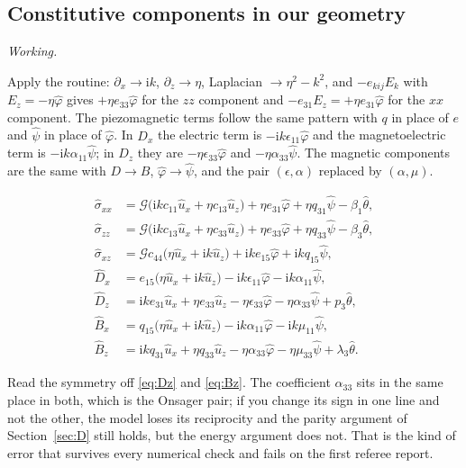 \documentclass[11pt,a4paper]{article}
\newif\ifshowworked \showworkedtrue
\newenvironment{worked}{\ifshowworked\par\smallskip\noindent\textit{Working.}\par\else\setbox0\vbox\bgroup\fi}{\ifshowworked\par\smallskip\else\egroup\fi}
\newcommand{\Gc}{\mathcal{G}}
\newcommand{\ii}{\mathrm{i}}
\newcommand{\bx}{\hat u_x}
\newcommand{\bz}{\hat u_z}
\newcommand{\bp}{\hat\varphi}
\newcommand{\bpsi}{\hat\psi}
\newcommand{\bt}{\hat\theta}
\newcommand{\aME}{\alpha}
\begin{document}
\subsection{Constitutive components in our geometry}

\begin{worked}
Apply the routine: $\partial_x\to\ii k$, $\partial_z\to\eta$, Laplacian $\to\eta^2-k^2$, and $-e_{kij}E_k$
with $E_z=-\eta\bp$ gives $+\eta e_{33}\bp$ for the $zz$ component and $-e_{31}E_z=+\eta e_{31}\bp$ for the
$xx$ component. The piezomagnetic terms follow the same pattern with $q$ in place of $e$ and $\bpsi$ in place
of $\bp$. In $D_x$ the electric term is $-\ii k\epsilon_{11}\bp$ and the magnetoelectric term is
$-\ii k\aME_{11}\bpsi$; in $D_z$ they are $-\eta\epsilon_{33}\bp$ and $-\eta\aME_{33}\bpsi$. The magnetic
components are the same with $D\to B$, $\bp\to\bpsi$, and the pair $(\epsilon,\aME)$ replaced by
$(\aME,\mu)$.
\end{worked}

\noindent
\begin{align}
\hat\sigma_{xx}&=\Gc\bigl(\ii kc_{11}\bx+\eta c_{13}\bz\bigr)+\eta e_{31}\bp+\eta q_{31}\bpsi-\beta_1\bt,
\label{eq:sxx}\\
\hat\sigma_{zz}&=\Gc\bigl(\ii kc_{13}\bx+\eta c_{33}\bz\bigr)+\eta e_{33}\bp+\eta q_{33}\bpsi-\beta_3\bt,
\label{eq:szz}\\
\hat\sigma_{xz}&=\Gc c_{44}\bigl(\eta\bx+\ii k\bz\bigr)+\ii ke_{15}\bp+\ii kq_{15}\bpsi,
\label{eq:sxz}\\
\hat D_x&=e_{15}\bigl(\eta\bx+\ii k\bz\bigr)-\ii k\epsilon_{11}\bp-\ii k\aME_{11}\bpsi,
\label{eq:Dx}\\
\hat D_z&=\ii ke_{31}\bx+\eta e_{33}\bz-\eta\epsilon_{33}\bp-\eta\aME_{33}\bpsi+p_3\bt,
\label{eq:Dz}\\
\hat B_x&=q_{15}\bigl(\eta\bx+\ii k\bz\bigr)-\ii k\aME_{11}\bp-\ii k\mu_{11}\bpsi,
\label{eq:Bx}\\
\hat B_z&=\ii kq_{31}\bx+\eta q_{33}\bz-\eta\aME_{33}\bp-\eta\mu_{33}\bpsi+\lambda_3\bt .
\label{eq:Bz}
\end{align}

Read the symmetry off \eqref{eq:Dz} and \eqref{eq:Bz}. The coefficient $\aME_{33}$ sits in the same place in
both, which is the Onsager pair; if you change its sign in one line and not the other, the model loses its
reciprocity and the parity argument of Section~\ref{sec:D} still holds, but the energy argument does not.
That is the kind of error that survives every numerical check and fails on the first referee report.
\end{document}
